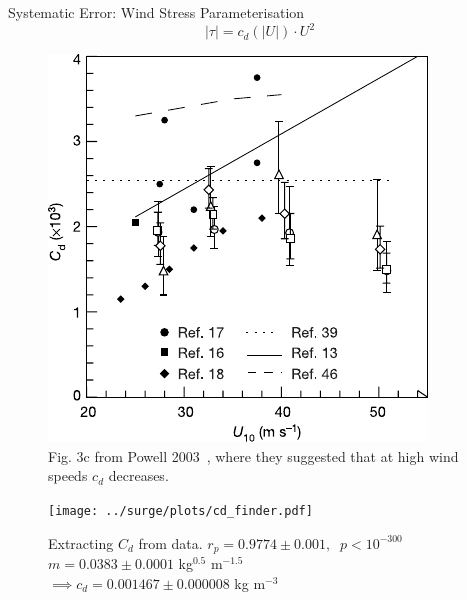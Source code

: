 \documentclass[usenames, dvipsnames]{beamer}
\begin{document}
\begin{frame}{Systematic Error: Wind Stress Parameterisation}
\vspace{-40pt}
\centering
\begin{equation}
 |\tau| = c_d(|U|) \cdot U^2
 \end{equation}

    \hspace{-30pt}\begin{minipage}{0.45\textwidth}
    \begin{figure}
            \includegraphics[width=1\linewidth]{images/example-images/cd.pdf}
                \caption{Fig. 3c from Powell 2003~\cite{powell2003reduced},
                 where they suggested that at high wind speeds $c_d$ decreases.}

    \end{figure}

    \end{minipage}\hspace{5pt}
      \begin{minipage}{0.57\textwidth}
\begin{figure}[htb!]
    \centering
    \texttt{[image: ../surge/plots/cd\_finder.pdf]}
    \caption{ Extracting $C_d$ from data.
    $ r_p = 0.9774 \pm 0.001,\;\; p<10^{-300}$\\
    $ m = 0.0383 \pm 0.0001 $ kg$^{0.5}$ m$^{-1.5}$\\
    $\implies  c_d = 0.001467 \pm 0.000008$ kg m$^{-3}$
    }
    \label{fig:}
\end{figure}
    \end{minipage}
\end{frame}
\end{document}
